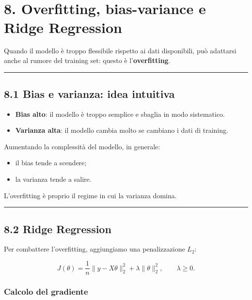 \documentclass{article}
\providecommand{\tightlist}{%
  \setlength{\itemsep}{0pt}\setlength{\parskip}{0pt}}
\begin{document}
\section{8. Overfitting, bias-variance e Ridge
Regression}\label{overfitting-bias-variance-e-ridge-regression}

Quando il modello è troppo flessibile rispetto ai dati disponibili, può
adattarsi anche al rumore del training set: questo è
l'\textbf{overfitting}.

\begin{center}\rule{0.5\linewidth}{0.5pt}\end{center}

\subsection{8.1 Bias e varianza: idea
intuitiva}\label{bias-e-varianza-idea-intuitiva}

\begin{itemize}
\tightlist
\item
  \textbf{Bias alto}: il modello è troppo semplice e sbaglia in modo
  sistematico.
\item
  \textbf{Varianza alta}: il modello cambia molto se cambiano i dati di
  training.
\end{itemize}

Aumentando la complessità del modello, in generale:

\begin{itemize}
\tightlist
\item
  il bias tende a scendere;
\item
  la varianza tende a salire.
\end{itemize}

L'overfitting è proprio il regime in cui la varianza domina.

\begin{center}\rule{0.5\linewidth}{0.5pt}\end{center}

\subsection{8.2 Ridge Regression}\label{ridge-regression}

Per combattere l'overfitting, aggiungiamo una penalizzazione \(L_2\):

\[
J(\theta)=\frac{1}{n}\|y-X\theta\|_2^2+\lambda\|\theta\|_2^2,
\qquad \lambda\ge 0.
\]

\subsubsection{Calcolo del gradiente}\label{calcolo-del-gradiente}
\end{document}
